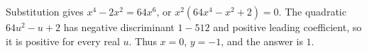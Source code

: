 Substitution gives $x^4-2x^2=64x^6$, or $x^2(64x^4-x^2+2)=0$. The quadratic $64u^2-u+2$ has negative discriminant $1-512$ and positive leading coefficient, so it is positive for every real $u$. Thus $x=0$, $y=-1$, and the answer is $\boxed1$.
